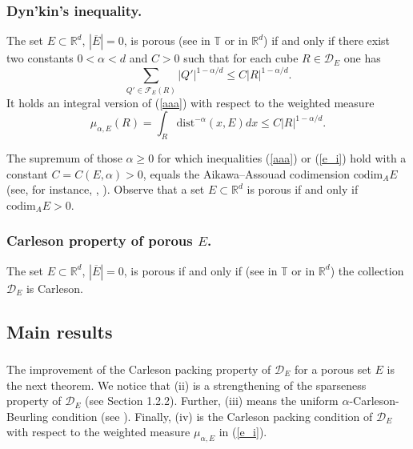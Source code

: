 \documentclass[12pt]{amsart} \setlength{\textwidth}{15cm} \setlength{\textheight}{24cm} \setlength{\voffset}{-1cm} \setlength{\oddsidemargin}{-0.4cm} \setlength{\evensidemargin}{-0.4cm}
\theoremstyle{definition}
\theoremstyle{remark}
\newcommand{\rd}{\mathbb{R}^d}
\begin{document}
  \subsubsection{  Dyn'kin's inequality.}       The set   $E \subset \rd$, $|\overline{E}|=0$, is porous (see  \cite{D} in $\mathbb{T}$   or \cite{Dy} in $\rd$) if and only if
  there exist two constants  $0<\alpha <d$ and $C >0$ such that for each cube $R \in \mathcal{D}_E$ one has
 \begin{equation}\label{aaa}
   \sum_{Q' \in \mathcal{F}_E(R)}|Q'|^{1-\alpha /d}\leq C |R|^{1-\alpha /d}.
 \end{equation}
It holds an  integral version of (\ref{aaa}) with respect to the weighted measure
  \begin{equation}\label{e_i}
 \mu_{\alpha,E}(R)= \int_{R}\mathrm{dist}^{-\alpha }(x, E)dx \leq C |R|^{1-\alpha/d}.
 \end{equation}



   The supremum of those $\alpha \geq 0$ for which  inequalities (\ref{aaa}) or   (\ref{e_i})
hold with a constant $C=C(E, \alpha)>0$,  equals the   Aikawa--Assouad codimension $\mathrm{codim}_A E$ (see, for instance, \cite{Dy}, \cite{LT}).  Observe that   a set $E \subset \rd$ is porous if and only if $\mathrm{codim}_A E >0$.
\subsubsection{  Carleson property of porous $E$.} The set   $E \subset \rd$, $|\overline{E}|=0$, is porous
if and only if (see  \cite{BNT} in $\mathbb{T}$   or \cite{V} in $\rd$) the collection  $\mathcal{D}_E$ is Carleson.





 \subsection{Main results}



\subsubsection{} The improvement of the Carleson packing property of $\mathcal{D}_E$ for a porous set $E$ is the next theorem. We notice that (ii) is a strengthening of the sparseness property of $\mathcal{D}_E$ (see Section 1.2.2). Further, (iii)  means the uniform $\alpha$-Carleson-Beurling  condition (see \cite[Lemma 3.1]{IN}). Finally, (iv) is  the Carleson packing condition of $\mathcal{D}_E$ with respect to the weighted measure
 $\mu_{\alpha,E}$ in (\ref{e_i}).
\end{document}
